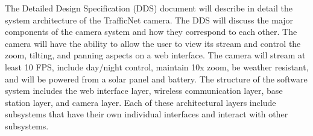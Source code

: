 
The Detailed Design Specification (DDS) document will describe in detail the system architecture of the TrafficNet camera. The DDS will discuss the major components of the camera system and how they correspond to each other. The camera will have the ability to allow the user to view its stream and control the zoom, tilting, and panning aspects on a web interface. The camera will stream at least 10 FPS, include day/night control, maintain 10x zoom, be weather resistant, and will be powered from a solar panel and battery. The structure of the software system includes the web interface layer, wireless communication layer, base station layer, and camera layer. Each of these architectural layers include subsystems that have their own individual interfaces and interact with other subsystems.
